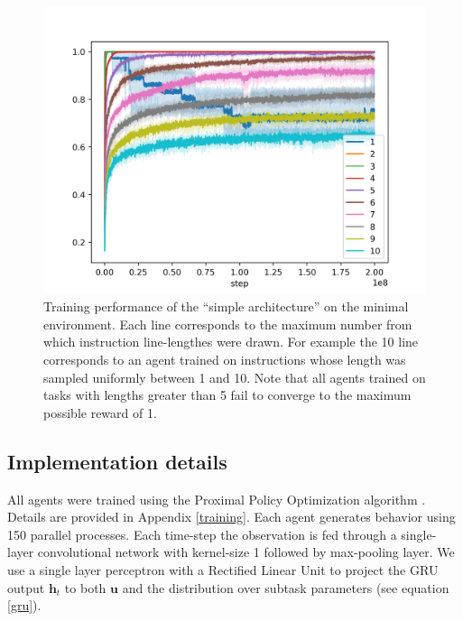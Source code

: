 \documentclass{article}
\begin{document}
\begin{figure}[t]
\vskip 0.2in
\centerline{\includegraphics[width=\columnwidth]{simple-rewards}}
\caption{Training performance of the ``simple architecture'' on the minimal
environment. Each line corresponds to the maximum number from which
instruction line-lengthes were drawn. For example the 10 line corresponds to an
agent trained on instructions whose length was sampled uniformly between 1 and
10. Note that all agents trained on tasks with lengths greater than 5 fail to
converge to the maximum possible reward of 1.}
\label{simple-rewards}
\vskip -0.2in
\end{figure}

\subsection{Implementation details}
All agents were trained using the Proximal Policy Optimization algorithm
\cite{schulman2017proximal}. Details are provided in Appendix \ref{training}.
Each agent generates behavior using 150 parallel processes. Each time-step the
observation is fed through a single-layer convolutional network with kernel-size
1 followed by max-pooling layer. We use a single layer perceptron with a
Rectified Linear Unit \cite{nair2010rectified} to project the GRU output
$\mathbf{h}_t$ to both $\mathbf{u}$ and the distribution over
subtask parameters (see equation \ref{gru}).
\end{document}
